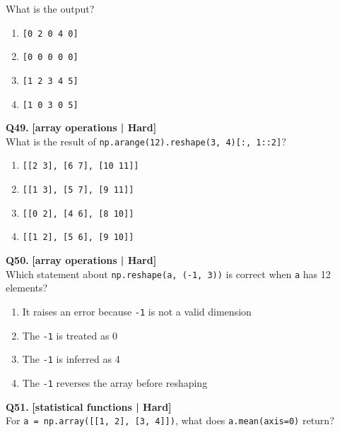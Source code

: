  What is the output?

\begin{enumerate}[label=(\alph*),topsep=2pt,itemsep=1pt,partopsep=0pt,parsep=0pt]
    \item \relax \texttt{[0 2 0 4 0]}
    \item \relax \texttt{[0 0 0 0 0]}
    \item \relax \texttt{[1 2 3 4 5]}
    \item \relax \texttt{[1 0 3 0 5]}
\end{enumerate}
\vspace{2mm}

\noindent\textbf{Q49.} \hfill {\small\color{LPUOrange}\textbf{[array operations | Hard]}}\\[2pt]
What is the result of \texttt{np.arange(12).reshape(3, 4)[:, 1::2]}?

\begin{enumerate}[label=(\alph*),topsep=2pt,itemsep=1pt,partopsep=0pt,parsep=0pt]
    \item \relax \texttt{[[2 3], [6 7], [10 11]]}
    \item \relax \texttt{[[1 3], [5 7], [9 11]]}
    \item \relax \texttt{[[0 2], [4 6], [8 10]]}
    \item \relax \texttt{[[1 2], [5 6], [9 10]]}
\end{enumerate}
\vspace{2mm}

\noindent\textbf{Q50.} \hfill {\small\color{LPUOrange}\textbf{[array operations | Hard]}}\\[2pt]
Which statement about \texttt{np.reshape(a, (-1, 3))} is correct when \texttt{a} has 12 elements?

\begin{enumerate}[label=(\alph*),topsep=2pt,itemsep=1pt,partopsep=0pt,parsep=0pt]
    \item \relax It raises an error because \texttt{-1} is not a valid dimension
    \item \relax The \texttt{-1} is treated as 0
    \item \relax The \texttt{-1} is inferred as 4
    \item \relax The \texttt{-1} reverses the array before reshaping
\end{enumerate}
\vspace{2mm}

\noindent\textbf{Q51.} \hfill {\small\color{LPUOrange}\textbf{[statistical functions | Hard]}}\\[2pt]
For \texttt{a = np.array([[1, 2], [3, 4]])}, what does \texttt{a.mean(axis=0)} return?

